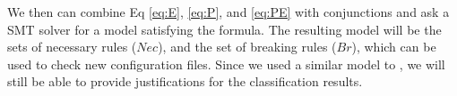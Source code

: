 We then can combine Eq \ref{eq:E}, \ref{eq:P}, and \ref{eq:PE} with
conjunctions and ask a SMT solver for a model satisfying the formula.
The resulting model will be the sets of necessary rules ($Nec$), and the set of breaking rules ($Br$), which can be used to check new configuration files.
Since we used a similar model to \app, we will still be able to provide justifications for the classification results.

